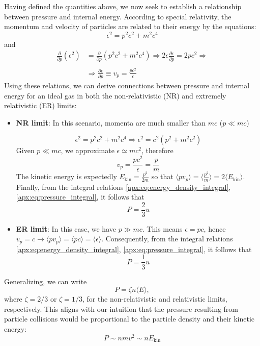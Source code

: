 \documentclass[main.tex]{subfiles}
\begin{document}
Having defined the quantities above, we now seek to establish a relationship between pressure and internal energy. According to special relativity, the momentum and velocity of particles are related to their energy by the equations:
\begin{equation}
    \epsilon^2 = p^2 c^2 + m^2 c^4
\end{equation}
and
\begin{align}
    \nonumber \frac{\partial}{\partial p} (\epsilon^2) &= \frac{\partial}{\partial p} (p^2 c^2 + m^2 c^4) \Rightarrow 2\epsilon \frac{\partial \epsilon}{\partial p} = 2p c^2 \Rightarrow \\\nonumber\\
    &\Rightarrow \frac{\partial \epsilon}{\partial p} \equiv v_p = \frac{pc^2}{\epsilon}
\end{align}
Using these relations, we can derive connections between pressure and internal energy for an ideal gas in both the non-relativistic (NR) and extremely relativistic (ER) limits:
\begin{itemize}
    \item \textbf{NR limit}: In this scenario, momenta are much smaller than $mc$ ($p \ll mc$)

    $$\epsilon^2 = p^2 c^2 + m^2 c^4 \Rightarrow \epsilon^2 = c^2 \left(p^2 + m^2c^2 \right)$$
    Given $p \ll mc$,  we approximate $\epsilon \simeq mc^2$, therefore
    $$v_p = \frac{pc^2}{\epsilon} = \frac{p}{m}$$
    The kinetic energy is expectedly $E_{\text{kin}} = \frac{p^2}{2m}$ so that $\langle p v_p \rangle = \langle \frac{p^2}{m} \rangle = 2 \langle E_{\text{kin}} \rangle $.
    Finally, from the integral relations \eqref{apx:eq:energy_density_integral}, \eqref{apx:eq:pressure_integral}, it follows that
    \begin{equation}
        \label{apx:eq:pressure_internal_energy_relation_for_nr_case}
        P = \frac{2}{3}u
    \end{equation}


    \item \textbf{ER limit}: In this case, we have $p \gg mc$. This means $\epsilon = pc$, hence $v_p = c \longrightarrow \langle p v_p \rangle = \langle pc \rangle = \langle \epsilon \rangle$.
    Consequently, from the integral relations \eqref{apx:eq:energy_density_integral}, \eqref{apx:eq:pressure_integral}, it follows that
    \begin{equation}
        \label{apx:eq:pressure_internal_energy_relation_for_er_case}
        P = \frac{1}{3}u
    \end{equation}
\end{itemize}
Generalizing, we can write
\begin{equation}\label{apx:eq:second_generalized_eos}
    P = \zeta n \langle E \rangle,
\end{equation}
where $\zeta = 2/3$ or $\zeta = 1/3$, for the non-relativistic and relativistic limits, respectively. This aligns with our intuition that the pressure resulting from particle collisions would be proportional to the particle density and their kinetic energy:
\begin{equation*}
    P \sim n mv^2 \sim n E_{\text{kin}}
\end{equation*}
\end{document}
